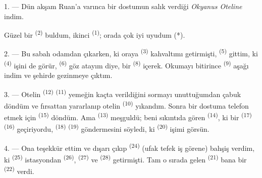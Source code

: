 %


\VUsaut{3.0mm}
\VUsaut{1.6mm}
\VUsaut{2.0mm}
\VUsaut{3.4mm}

1. --- Dün akşam Ruan'a varınca bir dostumun salık verdiği \textit{Okyanus
Oteline} indim.

Güzel bir  \textsuperscript{(2)} buldum, ikinci
 \textsuperscript{(1)}; orada çok iyi uyudum (*).

2. --- Bu sabah odamdan çıkarken, ki oraya 
\textsuperscript{(3)} kahvaltımı getirmişti, 
\textsuperscript{(5)} gittim, ki  \textsuperscript{(4)}
işini de görür,  \textsuperscript{(6)} göz atayım diye,
bir  \textsuperscript{(8)} içerek. Okumayı bitirince
 \textsuperscript{(9)} aşağı indim ve şehirde gezinmeye
çıktım.

3. --- Otelin  \textsuperscript{(12)} 
\textsuperscript{(11)} yemeğin kaçta verildiğini sormayı unuttuğumdan çabuk
döndüm ve fırsattan yararlanıp otelin 
\textsuperscript{(10)} yıkandım. Sonra bir dostuma telefon etmek için
 \textsuperscript{(15)} döndüm. Ama 
\textsuperscript{(13)} meşguldü; beni sıkıntıda gören 
\textsuperscript{(14)}, ki bir  \textsuperscript{(17)}
 \textsuperscript{(16)} geçiriyordu,
 \textsuperscript{(18)} 
\textsuperscript{(19)} göndermesini söyledi, ki 
\textsuperscript{(20)} işimi görsün.

4. --- Ona teşekkür ettim ve dışarı çıkıp 
\textsuperscript{(24)} (ufak tefek iş görene) bahşiş verdim, ki
 \textsuperscript{(25)} istasyondan  \textsuperscript{(26)},  \textsuperscript{(27)} ve
 \textsuperscript{(28)} getirmişti. Tam o sırada gelen
 \textsuperscript{(21)} bana bir 
\textsuperscript{(22)} verdi.

